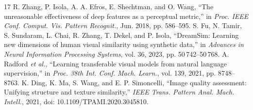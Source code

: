 \begin{thebibliography}{17}
 R. Zhang, P. Isola, A. A. Efros, E. Shechtman, and O. Wang, ``The unreasonable effectiveness of deep features as a perceptual metric,'' in \emph{Proc. IEEE Conf. Comput. Vis. Pattern Recognit.}, Jun. 2018, pp. 586--595.
 S. Fu, N. Tamir, S. Sundaram, L. Chai, R. Zhang, T. Dekel, and P. Isola, ``DreamSim: Learning new dimensions of human visual similarity using synthetic data,'' in \emph{Advances in Neural Information Processing Systems}, vol. 36, 2023, pp. 50\,742--50\,768.
 A. Radford \emph{et al.}, ``Learning transferable visual models from natural language supervision,'' in \emph{Proc. 38th Int. Conf. Mach. Learn.}, vol. 139, 2021, pp. 8748--8763.
 K. Ding, K. Ma, S. Wang, and E. P. Simoncelli, ``Image quality assessment: Unifying structure and texture similarity,'' \emph{IEEE Trans. Pattern Anal. Mach. Intell.}, 2021, doi: 10.1109/TPAMI.2020.3045810.
\end{thebibliography}
